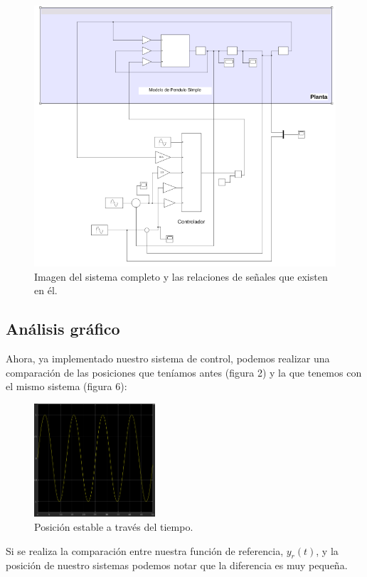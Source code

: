 \documentclass[12pt, letterpaper]{article}
\begin{document}
\begin{figure}[H]
	\centering
	\includegraphics[width=\textwidth]{system.png}
	\caption{Imagen del sistema completo y las relaciones de señales que existen en él.}
\end{figure}
\subsection*{Análisis gráfico}
Ahora, ya implementado nuestro sistema de control, podemos realizar una comparación de las posiciones que teníamos antes (figura 2) y la que tenemos con el mismo sistema (figura 6):

\begin{figure}[H]
	\centering
	\includegraphics[width=0.4\textwidth]{posnew.png}
	\caption{Posición estable a través del tiempo.}
\end{figure}

Si se realiza la comparación entre nuestra función de referencia, $y_r(t)$, y la posición de nuestro sistemas podemos notar que la diferencia es muy pequeña.
\end{document}

